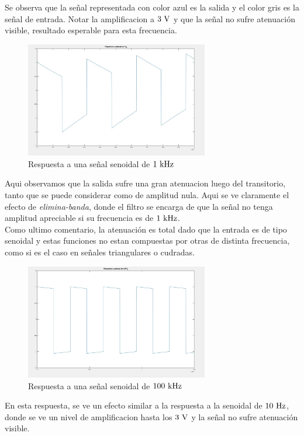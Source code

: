 Se observa que la señal representada con color azul es la salida  y el color gris es la señal de entrada. Notar la amplificacion a $3\ \si{\volt}$ y que la señal no sufre atenuaci\'on visible, resultado esperable para esta frecuencia.\\

\begin{figure}[!h]
	\centering
	\includegraphics[width=8cm]{imagenes/sen f.jpg}	\caption{Respuesta a una señal senoidal de $1\ \si{\kilo\hertz}$}	
\end{figure}

Aqui observamos que la salida sufre una gran atenuacion luego del transitorio, tanto que se puede considerar como de amplitud nula. Aqui se ve claramente el efecto de \textit{elimina-banda}, donde el filtro se encarga de que la señal no tenga amplitud apreciable si su frecuencia es de $1\ \si{\kilo\hertz}$.\\
Como ultimo comentario, la atenuaci\'on es total dado que la entrada es de tipo senoidal y estas funciones no estan compuestas por otras de distinta frecuencia,  como si es el  caso en señales triangulares o cudradas.\\

\begin{figure}[!h]
	\centering
	\includegraphics[width=8cm]{imagenes/sen 10f}	\caption{Respuesta a una señal senoidal de $100\ \si{\kilo\hertz}$}	
\end{figure}
En esta respuesta, se ve un efecto similar a la respuesta a la senoidal de $10\ \si{\hertz}$, donde se ve un nivel de  amplificacion hasta los $3\ \si{\volt}$ y la  señal no sufre atenuaci\'on visible.\\

